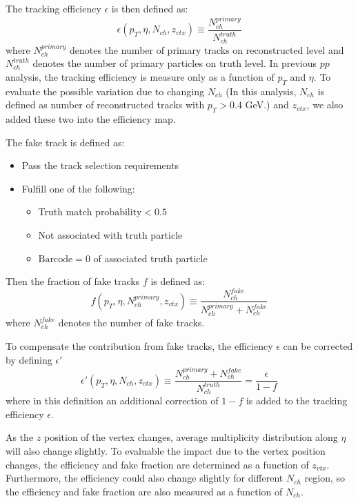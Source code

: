 The tracking efficiency $\epsilon$ is then defined as:
\begin{equation}
\epsilon(p_{T},\eta,N_{ch},z_{vtx})\equiv\frac{N_{ch}^{primary}}{N_{ch}^{truth}}
\end{equation}
where $N_{ch}^{primary}$ denotes the number of primary tracks on reconstructed level and $N_{ch}^{truth}$ denotes the number of primary particles on truth level. In previous $pp$ analysis, the tracking efficiency is measure only as a function of $p_{T}$ and $\eta$. To evaluate the possible variation due to changing $N_{ch}$ (In this analysis, $N_{ch}$ is defined as number of reconstructed tracks with $p_{T}>0.4$ GeV.) and $z_{vtx}$, we also added these two into the efficiency map.

The fake track is defined as:
\begin{itemize}
\item Pass the track selection requirements
\item Fulfill one of the following:
\begin{itemize}
\item Truth match $\text{probability}<0.5$
\item Not associated with truth particle
\item $\text{Barcode}=0$ of associated truth particle
\end{itemize}
\end{itemize}

Then the fraction of fake tracks $f$ is defined as:
\begin{equation}
f(p_{T},\eta,N_{ch}^{primary},z_{vtx})\equiv\frac{N_{ch}^{fake}}{N_{ch}^{primary}+N_{ch}^{fake}}
\end{equation}
where $N_{ch}^{fake}$ denotes the number of fake tracks.

To compensate the contribution from fake tracks, the efficiency $\epsilon$ can be corrected by defining $\epsilon'$
\begin{equation}
\epsilon'(p_{T},\eta,N_{ch},z_{vtx})\equiv\frac{N_{ch}^{primary}+N_{ch}^{fake}}{N_{ch}^{truth}}=\frac{\epsilon}{1-f}
\end{equation}
where in this definition an additional correction of $1-f$ is added to the tracking efficiency $\epsilon$.

As the $z$ position of the vertex changes, average multiplicity distribution along $\eta$ will also change slightly. To evaluable the impact due to the vertex position changes, the efficiency and fake fraction are determined as a function of $z_{vtx}$. Furthermore, the efficiency could also change slightly for different $N_{ch}$ region, so the efficiency and fake fraction are also measured as a function of $N_{ch}$.

